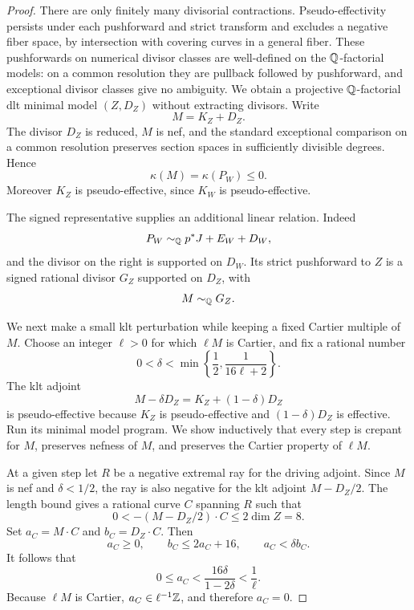 \begin{proof}
There are only finitely many divisorial contractions. Pseudo-effectivity
persists under each pushforward and strict transform and excludes a
negative fiber space, by intersection with covering curves in a
general fiber. These pushforwards on numerical divisor classes are
well-defined on the $\mathbb Q$-factorial models: on a common resolution they
are pullback followed by pushforward, and exceptional divisor classes
give no ambiguity. We obtain a projective $\mathbb Q$-factorial dlt minimal
model $(Z,D_Z)$ without extracting divisors. Write
\[
 M=K_Z+D_Z.
\]
The divisor $D_Z$ is reduced, $M$ is nef, and the standard exceptional
comparison on a common resolution preserves section spaces in
sufficiently divisible degrees. Hence
\[
 \kappa(M)=\kappa(P_W)\leq0.
\]
Moreover $K_Z$ is pseudo-effective, since $K_W$ is pseudo-effective.

The signed representative supplies an additional linear relation.
Indeed
\[
 P_W\sim_{\mathbb Q}p^*J+E_W+D_W,
\]
and the divisor on the right is supported on $D_W$. Its strict
pushforward to $Z$ is a signed rational divisor $G_Z$ supported on
$D_Z$, with
\begin{equation}
\label{eq:signed-supported-representative}
 M\sim_{\mathbb Q}G_Z.
\end{equation}

We next make a small klt perturbation while keeping a fixed Cartier
multiple of $M$. Choose an integer $\ell>0$ for which $\ell M$ is
Cartier, and fix a rational number
\begin{equation}
\label{eq:signed-delta-choice}
 0<\delta<\min\left\{\frac12,\frac{1}{16\ell+2}\right\}.
\end{equation}
The klt adjoint
\[
 M-\delta D_Z=K_Z+(1-\delta)D_Z
\]
is pseudo-effective because $K_Z$ is pseudo-effective and
$(1-\delta)D_Z$ is effective. Run its minimal model program. We show
inductively that every step is crepant for $M$, preserves nefness of
$M$, and preserves the Cartier property of $\ell M$.

At a given step let $R$ be a negative extremal ray for the driving
adjoint. Since $M$ is nef and $\delta<1/2$, the ray is also negative
for the klt adjoint $M-D_Z/2$. The length bound gives a rational curve
$C$ spanning $R$ such that
\[
 0<-(M-D_Z/2)\cdot C\leq 2\dim Z=8.
\]
Set $a_C=M\cdot C$ and $b_C=D_Z\cdot C$. Then
\[
 a_C\geq0,\qquad b_C\leq2a_C+16,
 \qquad a_C<\delta b_C.
\]
It follows that
\[
 0\leq a_C<\frac{16\delta}{1-2\delta}<\frac1\ell.
\]
Because $\ell M$ is Cartier, $a_C\in\ell^{-1}\mathbb Z$, and therefore
$a_C=0$.


\end{proof}
